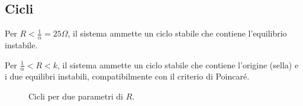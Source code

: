 \documentclass[11pt, a4paper]{article}
\begin{document}
\begin{enumerate}
\subsection{Cicli}
Per $R<\frac{1}{\alpha}=25 \Omega$, il sistema ammette un ciclo stabile che contiene l'equilibrio instabile.

Per $\frac{1}{\alpha} < R < k$, il sistema ammette un ciclo stabile che contiene l'origine (sella) e i due equilibri instabili, compatibilmente con il criterio di Poincaré.

\begin{figure}
\begin{center}
\vfill
{}
\caption{Cicli per due parametri di $R$.}
\label{fig:cicli}
\end{center}
\end{figure}

\end{enumerate}
\end{document}
